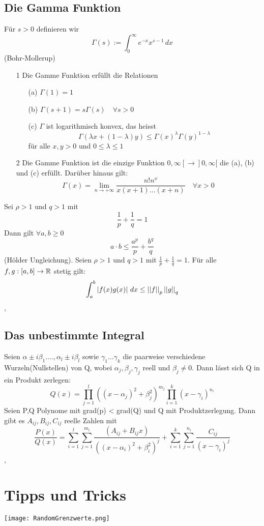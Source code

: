 \subsection{Die Gamma Funktion}
\Def[5.59] Für \(s > 0\) definieren wir
\[ \Gamma(s) := \int_{0}^{\infty} e^{-x}x^{s-1} \,dx\]
\Satz[5.60](Bohr-Mollerup)
\begin{enumerate}
    \item [1] Die Gamme Funktion erfüllt die Relationen
    \begin{enumerate}
        \item [(a)] \( \Gamma(1) = 1\)
        \item [(b)] \(\Gamma(s+1) = s\Gamma(s) \quad \forall s > 0 \)
        \item [(c)] \( \Gamma\) ist logarithmisch konvex, das heisst
        \[\Gamma( \lambda x + (1 - \lambda)y) \leq \Gamma(x)^{\lambda}\Gamma(y)^{1-\lambda}\]
        für alle \(x,y > 0\) und \(0 \leq \lambda \leq 1\)
    \end{enumerate}
    \item [2] Die Gamme Funktion ist die einzige Funktion \( 0, \infty[ \rightarrow ]0, \infty [\) die (a), (b) und (c) erfüllt. Darüber hinaus gilt:
    \[\Gamma(x) = \lim\limits_{n \rightarrow +\infty} \frac{n!n^x}{x(x+1) \dots (x+n)} \quad \forall x > 0\] 
\end{enumerate}
\Lemma[5.61] Sei \( \rho > 1\) und \(q > 1\) mit
\[ \frac{1}{p} + \frac{1}{q} = 1\]
Dann gilt \(\forall a,b \geq 0 \)
\[ a \cdot b \leq \frac{a^p}{p} + \frac{b^q}{q}\]
\Satz[5.62](Hölder Ungleichung). Seien \( \rho > 1\) und \( q > 1\) mit \( \frac{1}{p} + \frac{1}{q} = 1\). Für alle \(f,g : [a,b] \rightarrow \mathbb{R} \) stetig gilt:
\[ \int_{a}^{b} \left\lvert f(x)g(x) \right\rvert \,dx \leq \left\lvert \left\lvert f \right\rvert \right\rvert_p \left\lvert \left\lvert g \right\rvert \right\rvert_q\]
\sep
\subsection{Das unbestimmte Integral}
\Def[Produktzerlegung]
Seien \( \alpha \pm i\beta_1. \dots , \alpha_l \pm i\beta_l\) sowie \( \gamma_1 \dots \gamma_k \) die paarweise verschiedene Wurzeln(Nullstellen) von Q,
wobei \( \alpha_j, \beta_j, \gamma_j\) reell und \(\beta_j \neq 0\). Dann lässt sich Q in ein Produkt zerlegen:
\[ Q(x) = \prod_{j=1}^l ((x- \alpha_j)^2 + \beta_j^2)^{m_j} \prod_{i=1}^k (x - \gamma_i)^{n_i}\]
\Satz[5.65] Seien P,Q Polynome mit grad(p) < grad(Q) und Q mit Produktzerlegung. Dann gibt es \( A_{ij}, B_{ij}, C_{ij}\) reelle Zahlen mit
\[ \frac{P(x)}{Q(x)} = \sum_{i=1}^l \sum_{j=1}^{m_i} \frac{(A_{ij} + B_{ij}x)}{((x - \alpha_i)^2 + \beta_i^2)^j} + \sum_{i=1}^k \sum_{j=1}^{n_i} \frac{C_{ij}}{(x - \gamma_i)^j}\]
\sep
\section{Tipps und Tricks}
\texttt{[image: RandomGrenzwerte.png]}